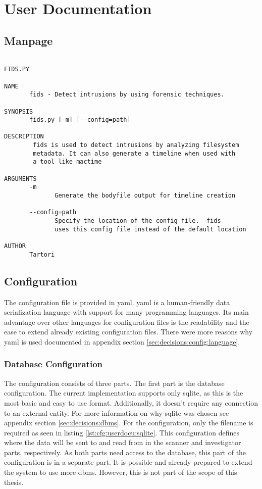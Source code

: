 \chapter{User Documentation}
\label{sec:userdocu}

\section{Manpage}

\begin{lstlisting}

FIDS.PY

NAME
       fids - Detect intrusions by using forensic techniques.

SYNOPSIS
       fids.py [-m] [--config=path]

DESCRIPTION
        fids is used to detect intrusions by analyzing filesystem
        metadata. It can also generate a timeline when used with 
        a tool like mactime

ARGUMENTS
       -m
              Generate the bodyfile output for timeline creation

       --config=path
              Specify the location of the config file.  fids
              uses this config file instead of the default location

AUTHOR
       Tartori

\end{lstlisting}

\section{Configuration}
\label{sec:userdocu:Configuration}

The configuration file is provided in \gls{yaml}. \gls{yaml} is a human-friendly data serialization language with support for many programming languages. Its main advantage over other languages for configuration files is the readability and the ease to extend already existing configuration files. There were more reasons why \gls{yaml} is used documented in appendix section \ref{sec:decisions:config:language}.

\subsection{Database Configuration}

The configuration consists of three parts. The first part is the database configuration. The current implementation supports only \gls{sqlite}, as this is the most basic and easy to use format. Additionally, it doesn't require any connection to an external entity. For more information on why \gls{sqlite} was chosen see appendix section \ref{sec:decisions:dbms}. For the configuration, only the filename is required as seen in listing \ref{lst:cfg:userdocu:sqlite}. This configuration defines where the data will be sent to and read from in the scanner and investigator parts, respectively. As both parts need access to the database, this part of the configuration is in a separate part. It is possible and already prepared to extend the system to use more \gls{dbms}. However, this is not part of the scope of this thesis.

